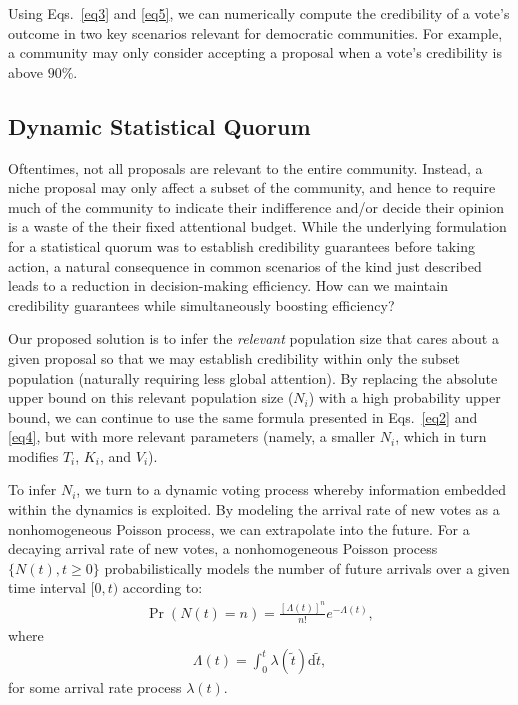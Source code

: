\documentclass[format=acmsmall, review=true, screen=true, anonymous=true]{acmart}
\begin{document}
Using Eqs.~\eqref{eq3} and \eqref{eq5}, we can numerically compute the credibility of a vote's outcome in two key scenarios relevant for democratic communities.  For example, a community may only consider accepting a proposal when a vote's credibility is above $90\%$.

\subsection{Dynamic Statistical Quorum}
Oftentimes, not all proposals are relevant to the entire community.  Instead, a niche proposal may only affect a subset of the community, and hence to require much of the community to indicate their indifference and/or decide their opinion is a waste of the their fixed attentional budget.  While the underlying formulation for a statistical quorum was to establish credibility guarantees before taking action, a natural consequence in common scenarios of the kind just described leads to a reduction in decision-making efficiency.  How can we maintain credibility guarantees while simultaneously boosting efficiency?

Our proposed solution is to infer the \textit{relevant} population size that cares about a given proposal so that we may establish credibility within only the subset population (naturally requiring less global attention).  By replacing the absolute upper bound on this relevant population size ($N_i$) with a high probability upper bound, we can continue to use the same formula presented in Eqs.~\eqref{eq2} and \eqref{eq4}, but with more relevant parameters (namely, a smaller $N_i$, which in turn modifies $T_i$, $K_i$, and $V_i$).

To infer $N_i$, we turn to a dynamic voting process whereby information embedded within the dynamics is exploited.  By modeling the arrival rate of new votes as a nonhomogeneous Poisson process, we can extrapolate into the future.  For a decaying arrival rate of new votes, a nonhomogeneous Poisson process $\{N(t),t\geq 0\}$ probabilistically models the number of future arrivals over a given time interval $[0,t)$ according to:
\begin{align*}
\Pr(N(t)=n)={\frac {[\Lambda (t)]^{n}}{n!}}e^{-\Lambda (t)},
\end{align*}
where
\begin{align*}
\Lambda (t)=\int _{0}^{t}\lambda (\tilde{t})\mathrm{d}\tilde{t},
\end{align*}
for some arrival rate process $\lambda (t)$.
\end{document}

